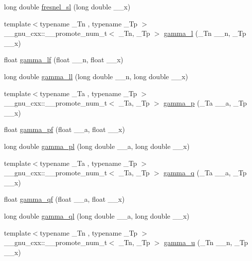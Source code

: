 \begin{DoxyCompactItemize}
long double \hyperlink{namespace____gnu__cxx_a5d6ac976fa316df9b943f92bafe1407d}{fresnel\+\_\+sl} (long double \+\_\+\+\_\+x)
\item 
{\footnotesize template$<$typename \+\_\+\+Tn , typename \+\_\+\+Tp $>$ }\\\+\_\+\+\_\+gnu\+\_\+cxx\+::\+\_\+\+\_\+promote\+\_\+num\+\_\+t$<$ \+\_\+\+Tn, \+\_\+\+Tp $>$ \hyperlink{namespace____gnu__cxx_ab3a75d57386806857b5f97c45b4ced6e}{gamma\+\_\+l} (\+\_\+\+Tn \+\_\+\+\_\+n, \+\_\+\+Tp \+\_\+\+\_\+x)
\item 
float \hyperlink{namespace____gnu__cxx_a3afdb94b9c107fe72386899ad84bc532}{gamma\+\_\+lf} (float \+\_\+\+\_\+n, float \+\_\+\+\_\+x)
\item 
long double \hyperlink{namespace____gnu__cxx_a80c72bee8364398f65c05e5147e03d80}{gamma\+\_\+ll} (long double \+\_\+\+\_\+n, long double \+\_\+\+\_\+x)
\item 
{\footnotesize template$<$typename \+\_\+\+Ta , typename \+\_\+\+Tp $>$ }\\\+\_\+\+\_\+gnu\+\_\+cxx\+::\+\_\+\+\_\+promote\+\_\+num\+\_\+t$<$ \+\_\+\+Ta, \+\_\+\+Tp $>$ \hyperlink{namespace____gnu__cxx_a7b31929f8a2368cff4d4304e3fd8a7be}{gamma\+\_\+p} (\+\_\+\+Ta \+\_\+\+\_\+a, \+\_\+\+Tp \+\_\+\+\_\+x)
\item 
float \hyperlink{namespace____gnu__cxx_ac9a59be05877d3c14fa95bebcf15e8df}{gamma\+\_\+pf} (float \+\_\+\+\_\+a, float \+\_\+\+\_\+x)
\item 
long double \hyperlink{namespace____gnu__cxx_aa37f4adf9942ce8e095f440963b330a6}{gamma\+\_\+pl} (long double \+\_\+\+\_\+a, long double \+\_\+\+\_\+x)
\item 
{\footnotesize template$<$typename \+\_\+\+Ta , typename \+\_\+\+Tp $>$ }\\\+\_\+\+\_\+gnu\+\_\+cxx\+::\+\_\+\+\_\+promote\+\_\+num\+\_\+t$<$ \+\_\+\+Ta, \+\_\+\+Tp $>$ \hyperlink{namespace____gnu__cxx_a6f8b617b9cbd4a822ee3328530372c9d}{gamma\+\_\+q} (\+\_\+\+Ta \+\_\+\+\_\+a, \+\_\+\+Tp \+\_\+\+\_\+x)
\item 
float \hyperlink{namespace____gnu__cxx_a3ee8d2c40b904952538709cbb0e664a4}{gamma\+\_\+qf} (float \+\_\+\+\_\+a, float \+\_\+\+\_\+x)
\item 
long double \hyperlink{namespace____gnu__cxx_a5364a098596681809294d25741539ffc}{gamma\+\_\+ql} (long double \+\_\+\+\_\+a, long double \+\_\+\+\_\+x)
\item 
{\footnotesize template$<$typename \+\_\+\+Tn , typename \+\_\+\+Tp $>$ }\\\+\_\+\+\_\+gnu\+\_\+cxx\+::\+\_\+\+\_\+promote\+\_\+num\+\_\+t$<$ \+\_\+\+Tn, \+\_\+\+Tp $>$ \hyperlink{namespace____gnu__cxx_a60911c010897719711d563edf69df44a}{gamma\+\_\+u} (\+\_\+\+Tn \+\_\+\+\_\+n, \+\_\+\+Tp \+\_\+\+\_\+x)

\end{DoxyCompactItemize}
